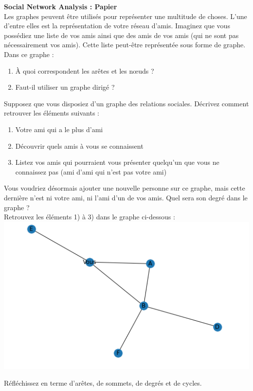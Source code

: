 \begin{Exercice}[10 minutes] \textbf{Social Network Analysis : Papier}\\
    Les graphes peuvent être utilisés pour représenter une multitude de choses.  L'une d'entre elles est la représentation de votre réseau d'amis. Imaginez que vous possédiez une liste de vos amis ainsi que des amis de vos amis (qui ne sont pas nécessairement vos amis). Cette liste peut-être représentée sous forme de graphe. Dans ce graphe :\\
    \begin{enumerate}
        \item  À quoi correspondent les arêtes et les nœuds ? 
        \item Faut-il utiliser un graphe dirigé ?
    \end{enumerate}
    Supposez que vous disposiez d'un graphe des relations sociales. Décrivez comment retrouver les éléments suivants :
    \begin{enumerate}
        \item Votre ami qui a le plus d'ami
        \item Découvrir quels amis à vous se connaissent
        \item Listez vos amis qui pourraient vous présenter quelqu'un que vous ne connaissez pas (ami d'ami qui n'est pas votre ami)
    \end{enumerate}
    Vous voudriez désormais ajouter une nouvelle personne sur ce graphe, mais cette dernière n'est ni votre ami, ni l'ami d'un de vos amis. Quel sera son degré dans le graphe ?\\
    
    Retrouvez les éléments 1) à 3) dans le graphe ci-dessous :\\
    \includegraphics[]{Network1.PNG}
    \begin{conseil}
        Réfléchissez en terme d'arêtes, de sommets, de degrés et de cycles.
    \end{conseil}


\end{Exercice}
